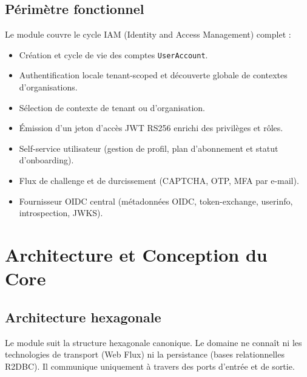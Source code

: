 \documentclass[11pt,a4paper,oneside]{report}
\newcommand{\code}[1]{\texttt{\small #1}}
\begin{document}
\section{Périmètre fonctionnel}
Le module couvre le cycle IAM (Identity and Access Management) complet :
\begin{itemize}
  \item Création et cycle de vie des comptes \code{UserAccount}.
  \item Authentification locale tenant-scoped et découverte globale de contextes d'organisations.
  \item Sélection de contexte de tenant ou d'organisation.
  \item Émission d'un jeton d'accès JWT RS256 enrichi des privilèges et rôles.
  \item Self-service utilisateur (gestion de profil, plan d'abonnement et statut d'onboarding).
  \item Flux de challenge et de durcissement (CAPTCHA, OTP, MFA par e-mail).
  \item Fournisseur OIDC central (métadonnées OIDC, token-exchange, userinfo, introspection, JWKS).
\end{itemize}

\chapter{Architecture et Conception du Core}

\section{Architecture hexagonale}
Le module suit la structure hexagonale canonique. Le domaine ne connaît ni les technologies de transport (Web Flux) ni la persistance (bases relationnelles R2DBC). Il communique uniquement à travers des ports d'entrée et de sortie.
\end{document}

